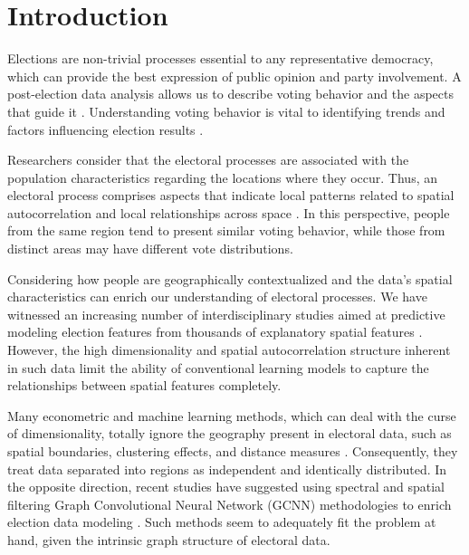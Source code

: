 \documentclass[runningheads]{llncs}
\begin{document}

\section{Introduction}

Elections are non-trivial processes essential to any representative democracy, which can provide the best expression of public opinion and party involvement. A post-election data analysis allows us to describe voting behavior and the aspects that guide it \cite{lucas2020}. Understanding voting behavior is vital to identifying trends and factors influencing election results \cite{layton2021demographic,pinheiro2020hope}.

Researchers consider that the electoral processes are associated with the population characteristics regarding the locations where they occur. Thus, an electoral process comprises aspects that indicate local patterns related to spatial autocorrelation and local relationships across space \cite{stewart2021scale}. In this perspective, people from the same region tend to present similar voting behavior, while those from distinct areas may have different vote distributions.

Considering how people are geographically contextualized and the data's spatial characteristics can enrich our understanding of electoral processes. We have witnessed an increasing number of interdisciplinary studies aimed at predictive modeling election features from thousands of explanatory spatial features \cite{tiago2021graph,li2019deep}. However, the high dimensionality and spatial autocorrelation structure inherent in such data limit the ability of conventional learning models to capture the relationships between spatial features completely.

Many econometric and machine learning methods, which can deal with the curse of dimensionality, totally ignore the geography present in electoral data, such as spatial boundaries, clustering effects, and distance measures \cite{graefe2019accuracy,chauhan2021emergence}. Consequently, they treat data separated into regions as independent and identically distributed. In the opposite direction, recent studies have suggested using spectral and spatial filtering Graph Convolutional Neural Network (GCNN) methodologies to enrich election data modeling \cite{li2019deep}. Such methods seem to adequately fit the problem at hand, given the intrinsic graph structure of electoral data.
\end{document}
